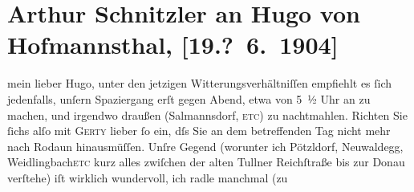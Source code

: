 

         
         \renewcommand{\erwaehntePersonen}{Personen: Hugo von Hofmannsthal, Gertrude von Hofmannsthal, Karl Kraus}
         \renewcommand{\erwaehnteOrte}{Orte: Exelbergstraße, Neuwaldegg, Niederlande, Pötzleinsdorf, Rodaun, Salmannsdorf, Sizilien, Weidlingbach, Wien}
         \renewcommand{\erwaehnteWerke}{}
               \section[Arthur Schnitzler an Hugo von Hofmannsthal, {[}19.? 6. 1904{]}]{ Arthur Schnitzler an Hugo von Hofmannsthal, {[}19.? 6. 1904{]}}\nopagebreak{}\rehead{ }\begin{ledgroupsized}[t]{13cm}\normalsize\beginnumbering{} \toendnotes[C]{\smallbreak\pagebreak[2]} 
\toendnotes[C]{\smallbreak}\pstart{}{\pb}mein lieber Hugo, \pend\pstart
           unter den jetzigen Witterungsverhältniſſen empfiehlt es ſich jedenfalls, unſern
               Spaziergang erſt gegen Abend, etwa von 5 ½ Uhr an zu
               machen, und irgendwo draußen (Salmannsdorf, \textsc{etc}) zu nachtmahlen. Richten Sie ſichs alſo mit \textsc{Gerty} lieber ſo ein, dſs Sie an dem betreffenden Tag nicht mehr nach Rodaun hinausmüſſen. Unſre Gegend (worunter ich
                  Pötzldorf, Neuwaldegg, {\pb}Weidlingbach\textsc{etc} kurz alles zwiſchen der alten Tullner Reichſtraße bis zur Donau verſtehe) iſt wirklich wundervoll, ich radle manchmal (zu

\end{ledgroupsized}
